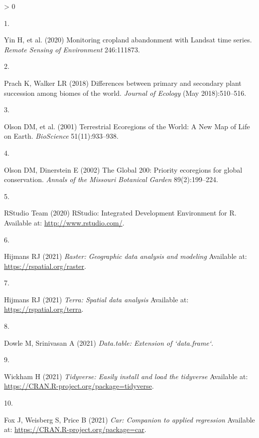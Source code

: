 \documentclass[9pt,twoside,lineno]{pnas-new}
\newlength{\csllabelwidth}
\newlength{\cslhangindent}
\newenvironment{CSLReferences}[2] %
 {%
  \setlength{\parindent}{0pt}
  \ifodd #1 \everypar{\setlength{\hangindent}{\cslhangindent}}\ignorespaces\fi
  \ifnum #2 > 0
  \setlength{\parskip}{#2\baselineskip}
  \fi
 }%
 {}
\newcommand{\CSLLeftMargin}[1]{\parbox[t]{\csllabelwidth}{#1}}
\newcommand{\CSLRightInline}[1]{\parbox[t]{\linewidth - \csllabelwidth}{#1}\break}
\begin{document}
\hypertarget{refs}{}
\begin{CSLReferences}{0}{0}
\leavevmode\hypertarget{ref-Yin2020}{}%
\CSLLeftMargin{1. }
\CSLRightInline{Yin H, et al. (2020) {Monitoring cropland abandonment with Landsat time series}. \emph{Remote Sensing of Environment} 246:111873.}

\leavevmode\hypertarget{ref-Prach2018}{}%
\CSLLeftMargin{2. }
\CSLRightInline{Prach K, Walker LR (2018) {Differences between primary and secondary plant succession among biomes of the world}. \emph{Journal of Ecology} (May 2018):510--516.}

\leavevmode\hypertarget{ref-Olson2001}{}%
\CSLLeftMargin{3. }
\CSLRightInline{Olson DM, et al. (2001) {Terrestrial Ecoregions of the World: A New Map of Life on Earth}. \emph{BioScience} 51(11):933--938.}

\leavevmode\hypertarget{ref-Olson2002}{}%
\CSLLeftMargin{4. }
\CSLRightInline{Olson DM, Dinerstein E (2002) {The Global 200: Priority ecoregions for global conservation}. \emph{Annals of the Missouri Botanical Garden} 89(2):199--224.}

\leavevmode\hypertarget{ref-RStudio}{}%
\CSLLeftMargin{5. }
\CSLRightInline{RStudio Team (2020) {RStudio: Integrated Development Environment for R}. Available at: \url{http://www.rstudio.com/}.}

\leavevmode\hypertarget{ref-R-raster}{}%
\CSLLeftMargin{6. }
\CSLRightInline{Hijmans RJ (2021) \emph{Raster: Geographic data analysis and modeling} Available at: \url{https://rspatial.org/raster}.}

\leavevmode\hypertarget{ref-R-terra}{}%
\CSLLeftMargin{7. }
\CSLRightInline{Hijmans RJ (2021) \emph{Terra: Spatial data analysis} Available at: \url{https://rspatial.org/terra}.}

\leavevmode\hypertarget{ref-R-data.table}{}%
\CSLLeftMargin{8. }
\CSLRightInline{Dowle M, Srinivasan A (2021) \emph{Data.table: Extension of `data.frame`}.}

\leavevmode\hypertarget{ref-R-tidyverse}{}%
\CSLLeftMargin{9. }
\CSLRightInline{Wickham H (2021) \emph{Tidyverse: Easily install and load the tidyverse} Available at: \url{https://CRAN.R-project.org/package=tidyverse}.}

\leavevmode\hypertarget{ref-R-car}{}%
\CSLLeftMargin{10. }
\CSLRightInline{Fox J, Weisberg S, Price B (2021) \emph{Car: Companion to applied regression} Available at: \url{https://CRAN.R-project.org/package=car}.}

\end{CSLReferences}



% 
\end{document}
